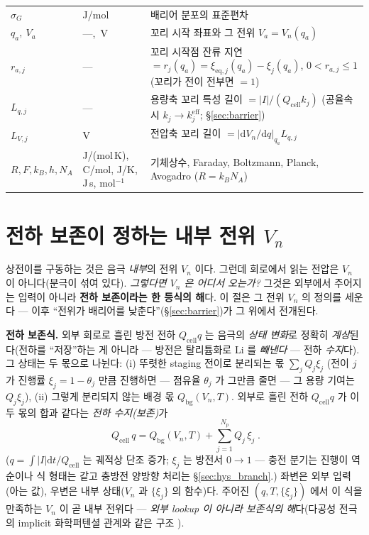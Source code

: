 \documentclass[11pt,a4paper]{article}
\newcommand{\dd}{\mathrm{d}}
\newcommand{\eff}{\mathrm{eff}}
\newcommand{\eq}{\mathrm{eq}}
\newcommand{\cell}{\mathrm{cell}}
\newcommand{\bg}{\mathrm{bg}}
\begin{document}
\begin{longtable}{p{} p{} p{}}
$\sigma_G$ & J/mol & 배리어 분포의 표준편차 \\
$q_a,\ V_a$ & ---,\ V & 꼬리 시작 좌표와 그 전위 $V_a=V_n(q_a)$ \\
$r_{a,j}$ & --- & 꼬리 시작점 잔류 지연 $=r_j(q_a)=\xi_{\eq,j}(q_a)-\xi_j(q_a)$, $0<r_{a,j}\le1$(꼬리가 전이 전부면 $=1$) \\
$L_{q,j}$ & --- & 용량축 꼬리 특성 길이 $=|I|/(Q_\cell k_j)$ (공율속 시 $k_j\!\to\!k_j^{\eff}$; \S\ref{sec:barrier}) \\
$L_{V,j}$ & V & 전압축 꼬리 길이 $=|\dd V_n/\dd q|_{q_a}L_{q,j}$ \\
$R,F,k_B,h,N_A$ & {\footnotesize J/(mol\,K), C/mol, J/K, J\,s, mol$^{-1}$} & 기체상수, Faraday, Boltzmann, Planck, Avogadro ($R=k_BN_A$) \\
\bottomrule
\end{longtable}

\section{전하 보존이 정하는 내부 전위 $V_n$}\label{sec:stage}
상전이를 구동하는 것은 음극 \emph{내부}의 전위 $V_n$ 이다. 그런데 회로에서 읽는 전압은
$V_n$ 이 아니다(분극이 섞여 있다). \emph{그렇다면 $V_n$ 은 어디서 오는가?} 그것은 외부에서 주어지는 입력이 아니라
\textbf{전하 보존이라는 한 등식의 해}다. 이 절은 그 전위 $V_n$ 의 정의를 세운다 — 이후 ``전위가 배리어를
낮춘다''(\S\ref{sec:barrier})가 그 위에서 전개된다.

\textbf{전하 보존식.} 외부 회로로 흘린 방전 전하 $Q_\cell q$ 는 음극의 \emph{상태 변화}로 정확히 \emph{계상}된다(전하를 ``저장''하는 게
아니라 — 방전은 탈리튬화로 Li 를 \emph{빼낸다} — 전하 \emph{수지}다). 그 상태는 두 몫으로 나뉜다:
(i) 뚜렷한 staging 전이로 분리되는 몫 $\sum_j Q_j\xi_j$ (전이 $j$ 가 진행률 $\xi_j=1-\theta_j$ 만큼 진행하면 — 점유율
$\theta_j$ 가 그만큼 줄면 — 그 용량 기여는 $Q_j\xi_j$), (ii) 그렇게 분리되지 않는 배경 몫 $Q_\bg(V_n,T)$. 외부로 흘린 전하 $Q_\cell q$ 가 이 두 몫의 합과
같다는 \emph{전하 수지(보존)}가
\begin{equation}
\boxed{\;Q_\cell\,q=Q_\bg(V_n,T)+\sum_{j=1}^{N_p}Q_j\,\xi_j\;.}
\label{eq:charge}
\end{equation}
($q=\int|I|\dd t/Q_\cell$ 는 궤적상 단조 증가; $\xi_j$ 는 방전서 $0\to1$ — 충전 분기는 진행이 역순이나 식 형태는 같고
충방전 양방향 처리는 \S\ref{sec:hys_branch}.) 좌변은 외부 입력(아는 값), 우변은 내부 상태($V_n$ 과 $\{\xi_j\}$ 의
함수)다. 주어진 $(q,T,\{\xi_j\})$ 에서 이
식을 만족하는 $V_n$ 이 곧 내부 전위다 — \emph{외부 lookup 이 아니라 보존식의 해}다(다공성 전극의 implicit
화학퍼텐셜 관계와 같은 구조 \cite{mckinnon1983,newman2004}).
\end{document}
